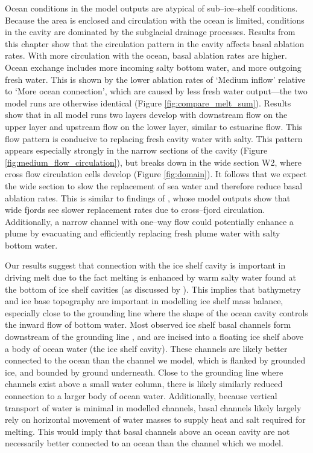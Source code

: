 Ocean conditions in the model outputs are atypical of sub--ice--shelf conditions. Because the area is enclosed and circulation with the ocean is limited, conditions in the cavity are dominated by the subglacial drainage processes.
Results from this chapter show that the circulation pattern in the cavity affects basal ablation rates. With more circulation with the ocean, basal ablation rates are higher. Ocean exchange includes more incoming salty bottom water, and more outgoing fresh water. This is shown by the lower ablation rates of `Medium inflow' relative to `More ocean connection', which are caused by less fresh water output---the two model runs are otherwise identical (Figure \ref{fig:compare_melt_sum}).  Results show that in all model runs two layers develop with downstream flow on the upper layer and upstream flow on the lower layer,  similar to estuarine flow. This flow pattern is conducive to replacing fresh cavity water with salty. This pattern appears especially strongly in the narrow sections of the cavity (Figure \ref{fig:medium_flow_circulation}), but breaks down in the wide section W2, where cross flow circulation cells develop (Figure \ref{fig:domain}). It follows that we expect the wide section to slow the replacement of sea water and therefore reduce basal ablation rates. This is similar to findings of \cite{carroll2017subglacial}, whose model outputs show that wide fjords see slower replacement rates due to cross--fjord circulation. Additionally, a narrow channel with one--way flow could potentially enhance a plume by evacuating and efficiently replacing fresh plume water with salty bottom water.

Our results suggest that connection with the ice shelf cavity is important in driving melt due to the fact melting is enhanced by warm salty water found at the bottom of ice shelf cavities  (as discussed by \cite{goldberg2019accurately}). This implies that bathymetry and ice base topography are important in modelling ice shelf mass balance, especially close to the grounding line where the shape of the ocean cavity controls the inward flow of bottom water. 
Most observed ice shelf basal channels form downstream of the grounding line \citep{alley2016impacts}, and are incised into a floating ice shelf above a body of ocean water (the ice shelf cavity). These channels are likely better connected to the ocean than the channel we model, which is flanked by grounded ice, and bounded by ground underneath. Close to the grounding line where channels exist above a small water column, there is likely similarly reduced connection to a larger body of ocean water. Additionally, because vertical transport of water is minimal in modelled channels, basal channels likely largely rely on horizontal movement of water masses to supply heat and salt required for melting. This would imply that basal channels above an ocean cavity are not necessarily better connected to an ocean than the channel which we model. 

